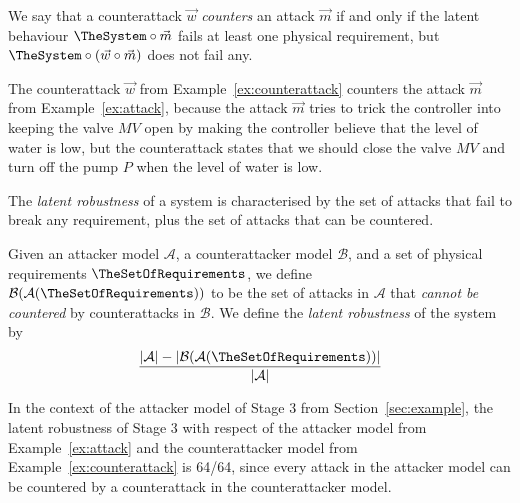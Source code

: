 {\begin{definition}
  We say that a counterattack $\vec{w}$ \emph{counters} an attack $\vec{m}$ if and only if the latent behaviour $\TheSystem\circ\vec{m}$ fails at least one physical requirement, but $\TheSystem\circ(\vec{w}\circ\vec{m})$ does not fail any.
\end{definition}
\begin{example}
  The counterattack $\vec{w}$ from Example~\ref{ex:counterattack} counters the attack $\vec{m}$ from Example~\ref{ex:attack}, because the attack $\vec{m}$ tries to trick the controller into keeping the valve $MV$ open by making the controller believe that the level of water is low, but the counterattack states that we should close the valve $MV$ and turn off the pump $P$ when the level of water is low.
\end{example}

The \emph{latent robustness} of a system is characterised by the set of attacks that fail to break any requirement, plus the set of attacks that can be countered.

\begin{definition}
  Given an attacker model $\mathcal{A}$, a counterattacker model $\mathcal{B}$, and a set of physical requirements $\TheSetOfRequirements$, we define $\mathcal{B}(\mathcal{A}(\TheSetOfRequirements))$ to be the set of attacks in $\mathcal{A}$ that \emph{cannot be countered} by counterattacks in $\mathcal{B}$. We define the \emph{latent robustness} of the system by 
  \begin{align*}
    \frac{|\mathcal{A}|-|\mathcal{B}(\mathcal{A}(\TheSetOfRequirements))|}{|\mathcal{A}|}
  \end{align*}
\end{definition}

\begin{example}
  In the context of the attacker model of Stage 3 from Section~\ref{sec:example}, the latent robustness of Stage 3 with respect of the attacker model from Example~\ref{ex:attack} and the counterattacker model from Example~\ref{ex:counterattack} is 64/64, since every attack in the attacker model can be countered by a counterattack in the counterattacker model.
\end{example}

}
